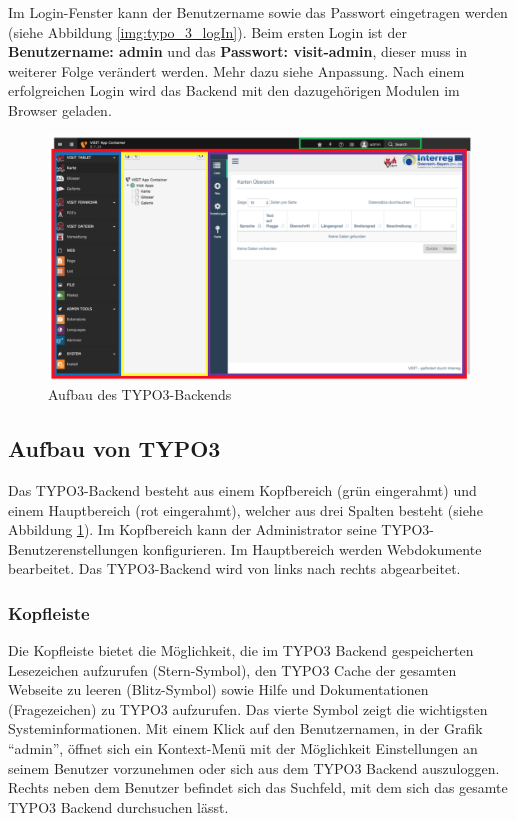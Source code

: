Im Login-Fenster kann der Benutzername sowie das Passwort eingetragen werden (siehe Abbildung \ref{img:typo_3_logIn}). Beim ersten Login ist der \textbf{Benutzername: admin} und das \textbf{Passwort: visit-admin}, dieser muss in weiterer Folge verändert werden. Mehr dazu siehe Anpassung.
Nach einem erfolgreichen Login wird das Backend mit den dazugehörigen Modulen im Browser geladen.

\begin{figure}[ht!]
\centering
\includegraphics[width=12cm]{Figures/paula/aufbau_TYPO3.png}
\caption{Aufbau des TYPO3-Backends}
\label{img:typo_3_backend}
\end{figure}

\subsection{Aufbau von TYPO3}

Das TYPO3-Backend besteht aus einem Kopfbereich (grün eingerahmt) und einem Hauptbereich (rot eingerahmt), welcher aus drei Spalten besteht (siehe Abbildung \ref{img:typo_3_backend}). Im Kopfbereich kann der Administrator seine TYPO3-Benutzerenstellungen konfigurieren. Im Hauptbereich werden Webdokumente bearbeitet. Das TYPO3-Backend wird von links nach rechts abgearbeitet.

\subsubsection{Kopfleiste}

Die Kopfleiste bietet die Möglichkeit, die im TYPO3 Backend gespeicherten Lesezeichen aufzurufen (Stern-Symbol), den TYPO3 Cache der gesamten Webseite zu leeren (Blitz-Symbol) sowie Hilfe und Dokumentationen (Fragezeichen) zu TYPO3 aufzurufen. Das vierte Symbol zeigt die wichtigsten Systeminformationen. Mit einem Klick auf den Benutzernamen, in der Grafik “admin”, öffnet sich ein Kontext-Menü mit der Möglichkeit Einstellungen an seinem Benutzer vorzunehmen oder sich aus dem TYPO3 Backend auszuloggen. Rechts neben dem Benutzer befindet sich das Suchfeld, mit dem sich das gesamte TYPO3 Backend durchsuchen lässt.

